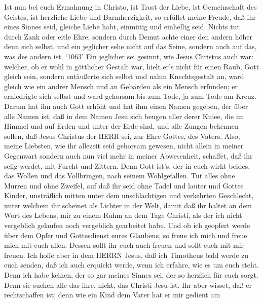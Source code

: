  Ist nun bei euch Ermahnung in Christo, ist Trost der Liebe,
ist Gemeinschaft des Geistes, ist herzliche Liebe und Barmherzigkeit,
 so erfüllet meine Freude, daß ihr eines Sinnes seid,
gleiche Liebe habt, einmütig und einhellig seid.  Nichts tut
durch Zank oder eitle Ehre; sondern durch Demut achte einer den andern
höher denn sich selbst,  und ein jeglicher sehe nicht auf
das Seine, sondern auch auf das, was des andern ist.  `1063'
Ein jeglicher sei gesinnt, wie Jesus Christus auch war: 
welcher, ob er wohl in göttlicher Gestalt war, hielt er's nicht für
einen Raub, Gott gleich sein,  sondern entäußerte sich
selbst und nahm Knechtsgestalt an, ward gleich wie ein andrer Mensch und
an Gebärden als ein Mensch erfunden;  er erniedrigte sich
selbst und ward gehorsam bis zum Tode, ja zum Tode am Kreuz.
 Darum hat ihn auch Gott erhöht und hat ihm einen Namen
gegeben, der über alle Namen ist,  daß in dem Namen Jesu
sich beugen aller derer Kniee, die im Himmel und auf Erden und unter der
Erde sind,  und alle Zungen bekennen sollen, daß Jesus
Christus der HERR sei, zur Ehre Gottes, des Vaters.  Also,
meine Liebsten, wie ihr allezeit seid gehorsam gewesen, nicht allein in
meiner Gegenwart sondern auch nun viel mehr in meiner Abwesenheit,
schaffet, daß ihr selig werdet, mit Furcht und Zittern. 
Denn Gott ist's, der in euch wirkt beides, das Wollen und das
Vollbringen, nach seinem Wohlgefallen.  Tut alles ohne
Murren und ohne Zweifel,  auf daß ihr seid ohne Tadel und
lauter und Gottes Kinder, unsträflich mitten unter dem unschlachtigen
und verkehrten Geschlecht, unter welchem ihr scheinet als Lichter in der
Welt,  damit daß ihr haltet an dem Wort des Lebens, mir zu
einem Ruhm an dem Tage Christi, als der ich nicht vergeblich gelaufen
noch vergeblich gearbeitet habe.  Und ob ich geopfert werde
über dem Opfer und Gottesdienst eures Glaubens, so freue ich mich und
freue mich mit euch allen.  Dessen sollt ihr euch auch
freuen und sollt euch mit mir freuen.  Ich hoffe aber in
dem HERRN Jesus, daß ich Timotheus bald werde zu euch senden, daß ich
auch erquickt werde, wenn ich erfahre, wie es um euch steht.
 Denn ich habe keinen, der so gar meines Sinnes sei, der so
herzlich für euch sorgt.  Denn sie suchen alle das ihre,
nicht, das Christi Jesu ist.  Ihr aber wisset, daß er
rechtschaffen ist; denn wie ein Kind dem Vater hat er mir gedient am
